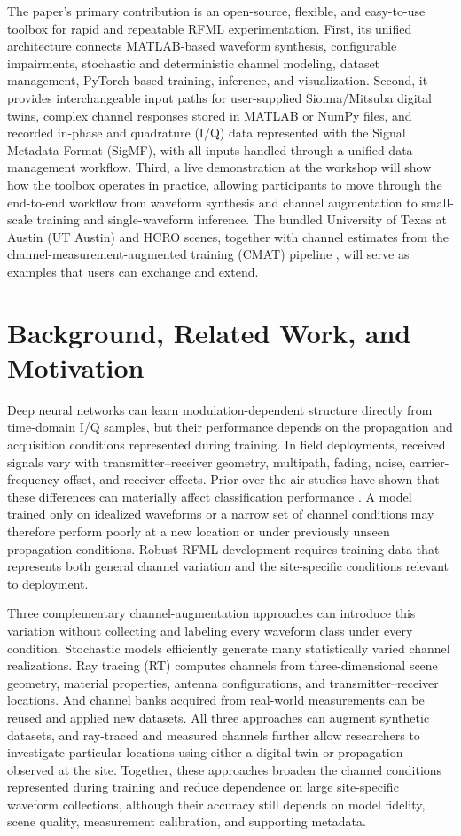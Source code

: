 \documentclass[10pt,conference,letterpaper]{IEEEtran}
\begin{document}
The paper's primary contribution is an open-source, flexible, and easy-to-use toolbox for rapid and repeatable RFML experimentation. First, its unified architecture connects MATLAB-based waveform synthesis, configurable impairments, stochastic and deterministic channel modeling, dataset management, PyTorch-based training, inference, and visualization. Second, it provides interchangeable input paths for user-supplied Sionna/Mitsuba digital twins, complex channel responses stored in MATLAB or NumPy files, and recorded in-phase and quadrature (I/Q) data represented with the Signal Metadata Format (SigMF), with all inputs handled through a unified data-management workflow. Third, a live demonstration at the workshop will show how the toolbox operates in practice, allowing participants to move through the end-to-end workflow from waveform synthesis and channel augmentation to small-scale training and single-waveform inference. The bundled University of Texas at Austin (UT Austin) and HCRO scenes, together with channel estimates from the channel-measurement-augmented training (CMAT) pipeline \cite{cmat}, will serve as examples that users can exchange and extend.


\section{Background, Related Work, and Motivation}
\label{sec:background}

Deep neural networks can learn modulation-dependent structure directly from time-domain I/Q samples, but their performance depends on the propagation and acquisition conditions represented during training. In field deployments, received signals vary with transmitter--receiver geometry, multipath, fading, noise, carrier-frequency offset, and receiver effects. Prior over-the-air studies have shown that these differences can materially affect classification performance \cite{oshea2018}. A model trained only on idealized waveforms or a narrow set of channel conditions may therefore perform poorly at a new location or under previously unseen propagation conditions. Robust RFML development requires training data that represents both general channel variation and the site-specific conditions relevant to deployment.

Three complementary channel-augmentation approaches can introduce this variation without collecting and labeling every waveform class under every condition. Stochastic models efficiently generate many statistically varied channel realizations. Ray tracing (RT) computes channels from three-dimensional scene geometry, material properties, antenna configurations, and transmitter--receiver locations. And channel banks acquired from real-world measurements can be reused and applied new datasets. All three approaches can augment synthetic datasets, and ray-traced and measured channels further allow researchers to investigate particular locations using either a digital twin or propagation observed at the site. Together, these approaches broaden the channel conditions represented during training and reduce dependence on large site-specific waveform collections, although their accuracy still depends on model fidelity, scene quality, measurement calibration, and supporting metadata.
\end{document}
